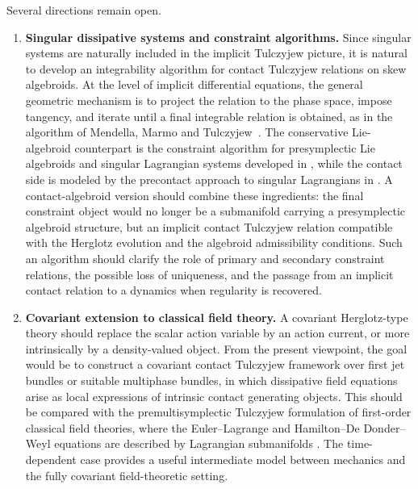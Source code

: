 \documentclass[11pt]{article}
\begin{document}
Several directions remain open.

\begin{enumerate}
\item \textbf{Singular dissipative systems and constraint algorithms.}
Since singular systems are naturally included in the implicit Tulczyjew picture, it is natural to develop an integrability algorithm for contact Tulczyjew relations on skew algebroids. At the level of implicit differential equations, the general geometric mechanism is to project the relation to the phase space, impose tangency, and iterate until a final integrable relation is obtained, as in the algorithm of Mendella, Marmo and Tulczyjew~\cite{MendellaMarmoTulczyjew1995}. The conservative Lie-algebroid counterpart is the constraint algorithm for presymplectic Lie algebroids and singular Lagrangian systems developed in \cite{IglesiasMarreroMartindeDiegoSosa2008}, while the contact side is modeled by the precontact approach to singular Lagrangians in \cite{deLeonLainz2019}. A contact-algebroid version should combine these ingredients: the final constraint object would no longer be a submanifold carrying a presymplectic algebroid structure, but an implicit contact Tulczyjew relation compatible with the Herglotz evolution and the algebroid admissibility conditions. Such an algorithm should clarify the role of primary and secondary constraint relations, the possible loss of uniqueness, and the passage from an implicit contact relation to a dynamics when regularity is recovered.

\item \textbf{Covariant extension to classical field theory.}
A covariant Herglotz-type theory should replace the scalar action variable by
an action current, or more intrinsically by a density-valued object. From the
present viewpoint, the goal would be to construct a covariant contact
Tulczyjew framework over first jet bundles or suitable multiphase bundles, in
which dissipative field equations arise as local expressions of intrinsic
contact generating objects. This should be compared with the
premultisymplectic Tulczyjew formulation of first-order classical field
theories, where the Euler--Lagrange and Hamilton--De Donder--Weyl equations
are described by Lagrangian submanifolds
\cite{Grabowska2012, GrabowskaGrabowski2013, CamposGuzmanMarrero2012}. The time-dependent case
\cite{GuzmanMarrero2010} provides a useful intermediate model between
mechanics and the fully covariant field-theoretic setting.



\end{enumerate}
\end{document}
